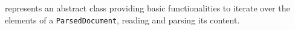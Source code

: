 represents an abstract class providing basic functionalities to iterate over the elements of a \texttt{ParsedDocument}, reading and parsing its content.

